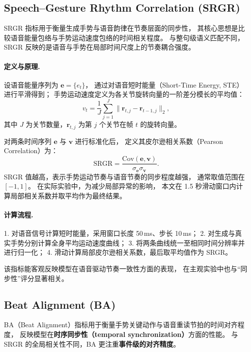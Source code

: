 \subsection{Speech–Gesture Rhythm Correlation (SRGR)}
\label{subsec:srgr}

SRGR 指标\cite{beatcamn}用于衡量生成手势与语音韵律在节奏层面的同步性，
其核心思想是比较语音能量包络与手势运动速度包络的时间相关程度。
与整句级语义匹配不同，SRGR 反映的是语音与手势在局部时间尺度上的节奏耦合强度。

\paragraph{定义与原理.}
设语音能量序列为 $\bm{e} = \{ e_t \}$，
通过对语音短时能量（Short-Time Energy, STE）进行平滑得到；
手势运动速度定义为各关节旋转向量的一阶差分模长的平均值：
\begin{equation}
v_t = \frac{1}{J}\sum_{j=1}^{J} \|\bm{r}_{t,j} - \bm{r}_{t-1,j}\|_2,
\end{equation}
其中 $J$ 为关节数量，$\bm{r}_{t,j}$ 为第 $j$ 个关节在帧 $t$ 的旋转向量。

对两条时间序列 $\bm{e}$ 与 $\bm{v}$ 进行标准化后，
定义其皮尔逊相关系数（Pearson Correlation）为：
\begin{equation}
\mathrm{SRGR} = \frac{\mathrm{Cov}(\bm{e}, \bm{v})}{\sigma_{\bm{e}}\sigma_{\bm{v}}}.
\end{equation}
SRGR 值越高，表示手势运动节奏与语音节奏的同步程度越强，
通常取值范围在 $[-1, 1]$。
在实际实验中，为减少局部异常的影响，
本文在 1.5 秒滑动窗口内计算局部相关系数并取平均作为最终结果。

\paragraph{计算流程.}
1. 对语音信号计算短时能量，采用窗口长度 50\,ms、步长 10\,ms；  
2. 对生成与真实手势分别计算全身平均运动速度曲线；  
3. 将两条曲线统一至相同时间分辨率并进行归一化；  
4. 滑动计算局部皮尔逊相关系数，最后取平均值作为 SRGR。

该指标能客观反映模型在语音驱动节奏一致性方面的表现，
在主观实验中也与“同步性”评分显著相关。

\subsection{Beat Alignment (BA)}
\label{subsec:ba}

BA（Beat Alignment）指标\cite{beatcamn}用于衡量手势关键动作与语音重读节拍的时间对齐程度，
反映模型在\textbf{时序同步性（temporal synchronization）}方面的性能。
与 SRGR 的全局相关性不同，BA 更注重\textbf{事件级的对齐精度}。

